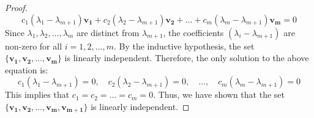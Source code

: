 \documentclass[openany]{book}
\begin{document}
\begin{proof}
    $$c_1(\lambda_1 - \lambda_{m+1})\mathbf{v_1} + c_2(\lambda_2 - \lambda_{m+1})\mathbf{v_2} + \ldots + c_m(\lambda_m - \lambda_{m+1})\mathbf{v_m} = 0$$
    Since $\lambda_1, \lambda_2, \ldots, \lambda_m$ are distinct from $\lambda_{m+1}$, the coefficients $(\lambda_i - \lambda_{m+1})$ are non-zero for all $i = 1, 2, \ldots, m$. By the inductive hypothesis, the set $\{\mathbf{v_1}, \mathbf{v_2}, \ldots, \mathbf{v_m}\}$ is linearly independent. Therefore, the only solution to the above equation is:
    $$c_1(\lambda_1 - \lambda_{m+1}) = 0, \quad c_2(\lambda_2 - \lambda_{m+1}) = 0, \quad \ldots, \quad c_m(\lambda_m - \lambda_{m+1}) = 0$$
    This implies that $c_1 = c_2 = \ldots = c_m = 0$. Thus, we have shown that the set $\{\mathbf{v_1}, \mathbf{v_2}, \ldots, \mathbf{v_m}, \mathbf{v_{m+1}}\}$ is linearly independent.
\end{proof}
\end{document}
